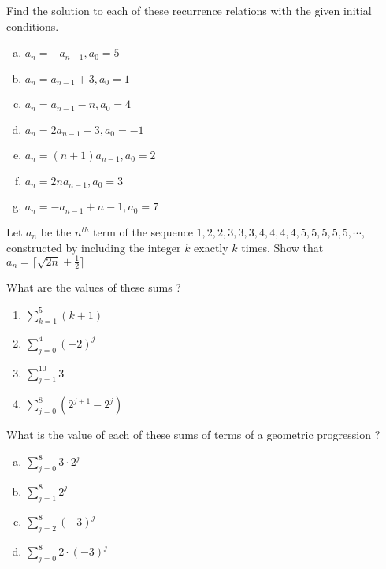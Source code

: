 \documentclass{article}
\newenvironment{problem}[2][Problem]{\begin{trivlist}
\item[\hskip \labelsep {\bfseries #1}\hskip \labelsep {\bfseries #2.}]}{\end{trivlist}}
\begin{document}
\begin{problem}{4}[Chapter 2.4, Question 16]
    Find the solution to each of these recurrence relations with the given initial conditions.
    \begin{enumerate}[(a)]
    \item  $a_n = -a_{n-1}, a_0 = 5$
    \item  $a_n = a_{n-1} + 3, a_0 = 1$
    \item $a_n = a_{n-1} - n, a_0 = 4 $
    \item  $a_n = 2a_{n-1} - 3, a_0 = -1 $
    \item $a_n = (n + 1)a_{n-1}, a_0 = 2 $
    \item  $a_n = 2na_{n-1}, a_0 = 3$
    \item $a_n = -a_{n-1} + {n - 1}, a_0 = 7$
    \end{enumerate}


\end{problem}

\begin{problem}{5}[Chapter 2.4, Question 28]
Let $a_n$ be the $n^{th}$ term of the sequence $1,2,2,3,3,3,4,4,4,4,5,5,5,5,5,\cdots,$ constructed by
including the integer $k$ exactly $k$ times. Show that $a_n = \lceil \sqrt{2n} + \frac{1}{2} \rceil$
    
\end{problem}

\begin{problem}{6}[Chapter 2.4, Question 29]
    What are the values of these sums ?
    \begin{enumerate}
        \item $\sum_{k=1}^{5} (k+1)$
        \item $\sum_{j=0}^{4} (-2)^j$
        \item $\sum_{j=1}^{10} 3$
        \item $\sum_{j=0}^{8} (2^{j+1} - 2^{j})$
    \end{enumerate}
    
\end{problem}

\begin{problem}{7}[Chapter 2.4, Question 31]
    What is the value of each of these sums of terms of a geometric progression ?
    \begin{enumerate}[(a)]
        \item $\sum_{j=0}^{8} 3 \cdot 2^j $
        \item $\sum_{j=1}^{8}  2^j $
        \item $\sum_{j=2}^{8}  (-3)^j $
        \item $\sum_{j=0}^{8} 2 \cdot (-3)^j $
    \end{enumerate}
    
\end{problem}
\end{document}
